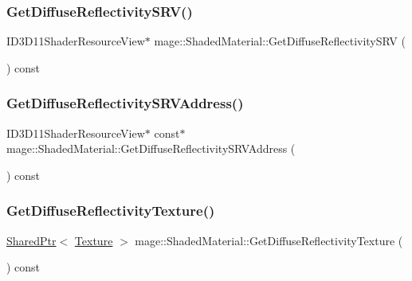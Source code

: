 \subsubsection{\texorpdfstring{Get\+Diffuse\+Reflectivity\+S\+R\+V()}{GetDiffuseReflectivitySRV()}}
{\footnotesize\ttfamily I\+D3\+D11\+Shader\+Resource\+View$\ast$ mage\+::\+Shaded\+Material\+::\+Get\+Diffuse\+Reflectivity\+S\+RV (\begin{DoxyParamCaption}{ }\end{DoxyParamCaption}) const\hspace{0.3cm}{\ttfamily [noexcept]}}

\hypertarget{structmage_1_1_shaded_material_ac16eeb140fbe15f410021ad56c8d7f6d}{}\label{structmage_1_1_shaded_material_ac16eeb140fbe15f410021ad56c8d7f6d} 
\subsubsection{\texorpdfstring{Get\+Diffuse\+Reflectivity\+S\+R\+V\+Address()}{GetDiffuseReflectivitySRVAddress()}}
{\footnotesize\ttfamily I\+D3\+D11\+Shader\+Resource\+View$\ast$ const$\ast$ mage\+::\+Shaded\+Material\+::\+Get\+Diffuse\+Reflectivity\+S\+R\+V\+Address (\begin{DoxyParamCaption}{ }\end{DoxyParamCaption}) const\hspace{0.3cm}{\ttfamily [noexcept]}}

\hypertarget{structmage_1_1_shaded_material_a461a080a923578673ce04c83cc3d9dbd}{}\label{structmage_1_1_shaded_material_a461a080a923578673ce04c83cc3d9dbd} 
\subsubsection{\texorpdfstring{Get\+Diffuse\+Reflectivity\+Texture()}{GetDiffuseReflectivityTexture()}}
{\footnotesize\ttfamily \hyperlink{namespacemage_a1e01ae66713838a7a67d30e44c67703e}{Shared\+Ptr}$<$ \hyperlink{classmage_1_1_texture}{Texture} $>$ mage\+::\+Shaded\+Material\+::\+Get\+Diffuse\+Reflectivity\+Texture (\begin{DoxyParamCaption}{ }\end{DoxyParamCaption}) const\hspace{0.3cm}{\ttfamily [noexcept]}}

